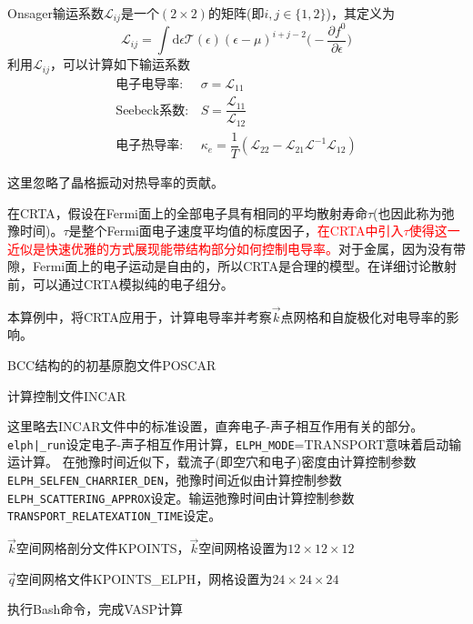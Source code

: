 {\textrm{Onsager}输运系数$\mathcal{L}_{ij}$是一个$(2\times2)$的矩阵(即$i,j\in\{1,2\}$)，其定义为
\begin{displaymath}
	\mathcal{L}_{ij}=\int\mathrm{d}\epsilon\mathcal{T}(\epsilon)(\epsilon-\mu)^{i+j-2}\bigg(-\dfrac{\partial f^0}{\partial\epsilon}\bigg)
\end{displaymath}
利用$\mathcal{L}_{ij}$，可以计算如下输运系数
\begin{displaymath}
	\begin{aligned}
		电子电导率: &\sigma=\mathcal{L}_{11}\\
		\mathrm{Seebeck}系数: &S=\dfrac{\mathcal{L}_{11}}{\mathcal{L}_{12}}\\
		电子热导率: &\kappa_e=\dfrac1{T}(\mathcal{L}_{22}-\mathcal{L}_{21}\mathcal{L}^{-1}\mathcal{L}_{12})
	\end{aligned}
\end{displaymath}

这里忽略了晶格振动对热导率的贡献。

在\textrm{CRTA}，假设在\textrm{Fermi}面上的全部电子具有相同的平均散射寿命$\tau$(也因此称为弛豫时间)。$\tau$是整个\textrm{Fermi}面电子速度平均值的标度因子，\textcolor{red}{在\textrm{CRTA}中引入$\tau$使得这一近似是快速优雅的方式展现能带结构部分如何控制电导率。}对于金属，因为没有带隙，\textrm{Fermi}面上的电子运动是自由的，所以\textrm{CRTA}是合理的模型。在详细讨论散射前，可以通过\textrm{CRTA}模拟纯的电子组分。

本算例中，将\textrm{CRTA}应用于，计算电导率并考察$\vec k$点网格和自旋极化对电导率的影响。

\textrm{BCC}结构的的初基原胞文件\textrm{POSCAR}

计算控制文件\textrm{INCAR}

这里略去\textrm{INCAR}文件中的标准设置，直奔电子-声子相互作用有关的部分。\texttt{elph|_run}设定电子-声子相互作用计算，\texttt{ELPH\_MODE}=\textrm{TRANSPORT}意味着启动输运计算。%
在弛豫时间近似下，载流子(即空穴和电子)密度由计算控制参数\texttt{ELPH\_SELFEN\_CHARRIER\_DEN}，弛豫时间近似由计算控制参数\texttt{ELPH\_SCATTERING\_APPROX}设定。输运弛豫时间由计算控制参数\texttt{TRANSPORT\_RELATEXATION\_TIME}设定。

$\vec k$空间网格剖分文件\textrm{KPOINTS}，$\vec k$空间网格设置为$12\times12\times12$

$\vec q$空间网格文件\textrm{KPOINTS\_ELPH}，网格设置为$24\times24\times24$

执行\textrm{Bash}命令，完成\textrm{VASP}计算

}
